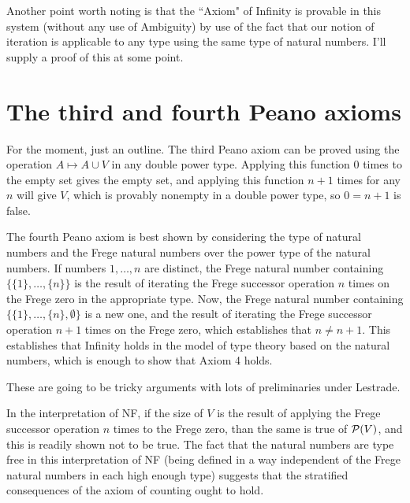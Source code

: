\documentclass[12pt]{article}
\begin{document}
Another point worth noting is that the ``Axiom" of Infinity is provable in this system (without any use of Ambiguity) by use of the fact that our notion of iteration is applicable to any type using the same type of natural numbers.  I'll supply a proof of this at some point.

\section{The third and fourth Peano axioms}

For the moment, just an outline.  The third Peano axiom can be proved using the operation $A \mapsto A \cup V$ in any double power type.  Applying this function 0 times to the empty set gives the empty set, and applying this function $n+1$ times for any $n$ will give $V$, which is provably nonempty in a double power type, so $0=n+1$ is false.

The fourth Peano axiom is best shown by considering the type of natural numbers and the Frege natural numbers over the power type of the natural numbers.  If numbers $1,\ldots,n$ are distinct, the Frege natural number containing $\{\{1\},\ldots,\{n\}\}$ is the result of iterating the Frege successor operation $n$ times on the Frege zero in the appropriate type.  Now, the Frege natural number containing $\{\{1\},\ldots,\{n\},\emptyset\}$ is a new one, and the result of iterating the Frege successor operation $n+1$ times on the Frege zero, which establishes that $n \neq n+1$.   This establishes that Infinity holds in the model of type theory based on the natural numbers, which is enough to show that Axiom 4 holds.

These are going to be tricky arguments with lots of preliminaries under Lestrade.

In the interpretation of NF, if the size of $V$ is the result of applying the Frege successor operation $n$ times to the Frege zero, than the same is true of ${\cal  P}(V)$, and this is readily shown not to be true.  The fact that the natural numbers are type free in this interpretation of NF (being defined in a way independent of the Frege natural numbers in each high enough type) suggests that the stratified consequences of the axiom of counting ought to hold.
\end{document}
